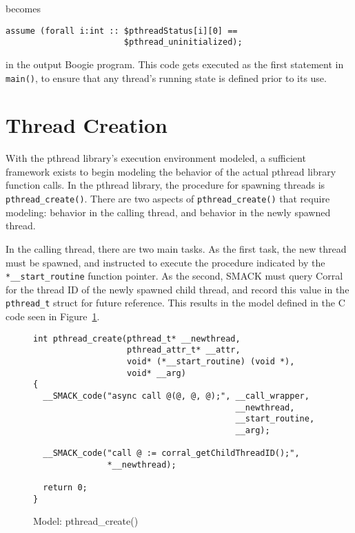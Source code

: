 \noindent becomes 

\begin{lstlisting}[frame=none,xleftmargin=2\parindent,language=boogie]
assume (forall i:int :: $pthreadStatus[i][0] == 
                        $pthread_uninitialized);
\end{lstlisting}

\noindent in the output Boogie program.  This code gets executed as
the first statement in \lstinline|main()|, to ensure that any thread's
running state is defined prior to its use. 

\section{Thread Creation}
With the pthread library's execution environment modeled, a sufficient
framework exists to begin modeling the behavior of the actual pthread
library function calls.  In the pthread library, the procedure for
spawning threads is \lstinline|pthread_create()|.  There are two
aspects of \lstinline|pthread_create()| that require modeling:
behavior in the calling thread, and behavior in the newly spawned
thread. 

In the calling thread, there are two main tasks.  As the first task,
the new thread must be spawned, and instructed to execute the
procedure indicated by the \lstinline|*__start_routine| function
pointer.  As the second, SMACK must query Corral for the thread ID of
the newly spawned child thread, and record this value in the
\lstinline|pthread_t| struct for future reference.  This results in
the model defined in the C code seen in Figure~\ref{fig:pthread_create}.

\begin{figure}[h]
\centering
\caption{Model: pthread\_create()}\label{fig:pthread_create}
\begin{lstlisting}
int pthread_create(pthread_t* __newthread,
                   pthread_attr_t* __attr,
                   void* (*__start_routine) (void *),
                   void* __arg)
{
  __SMACK_code("async call @(@, @, @);", __call_wrapper,
                                         __newthread,
                                         __start_routine,
                                         __arg);

  __SMACK_code("call @ := corral_getChildThreadID();",
               *__newthread);

  return 0;
}
\end{lstlisting}
\end{figure}

